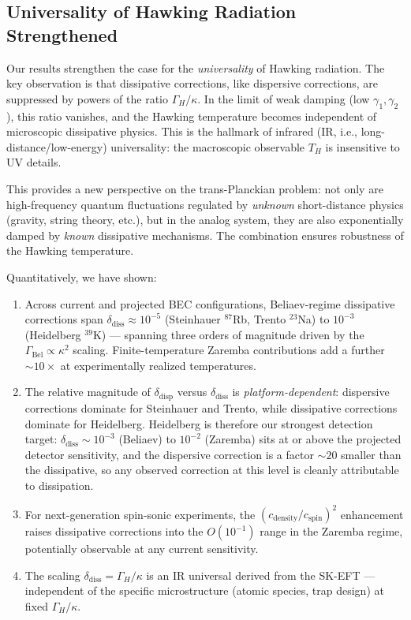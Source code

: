 \documentclass[aps,prl,twocolumn,superscriptaddress,nofootinbib,amsmath,amssymb]{revtex4-2}
\begin{document}
\subsection{Universality of Hawking Radiation Strengthened}

Our results strengthen the case for the \textit{universality} of Hawking radiation. The key observation is that dissipative corrections, like dispersive corrections, are suppressed by powers of the ratio $\Gamma_H / \kappa$. In the limit of weak damping (low $\gamma_1, \gamma_2$), this ratio vanishes, and the Hawking temperature becomes independent of microscopic dissipative physics. This is the hallmark of infrared (IR, i.e., long-distance/low-energy) universality: the macroscopic observable $T_H$ is insensitive to UV details.

This provides a new perspective on the trans-Planckian problem: not only are high-frequency quantum fluctuations regulated by \textit{unknown} short-distance physics (gravity, string theory, etc.), but in the analog system, they are also exponentially damped by \textit{known} dissipative mechanisms. The combination ensures robustness of the Hawking temperature.

Quantitatively, we have shown:
\begin{enumerate}
\item Across current and projected BEC configurations, Beliaev-regime dissipative
  corrections span $\delta_{\text{diss}} \approx 10^{-5}$ (Steinhauer $^{87}$Rb, Trento
  $^{23}$Na) to $10^{-3}$ (Heidelberg $^{39}$K) --- spanning three orders of magnitude
  driven by the $\Gamma_{\mathrm{Bel}} \propto \kappa^2$ scaling.
  Finite-temperature Zaremba contributions add a further $\sim\!10\times$ at
  experimentally realized temperatures.
\item The relative magnitude of $\delta_{\text{disp}}$ versus $\delta_{\text{diss}}$ is
  \emph{platform-dependent}: dispersive corrections dominate for Steinhauer and Trento,
  while dissipative corrections dominate for Heidelberg. Heidelberg is therefore our
  strongest detection target: $\delta_{\text{diss}} \sim 10^{-3}$ (Beliaev) to $10^{-2}$
  (Zaremba) sits at or above the projected detector sensitivity, and the dispersive
  correction is a factor ${\sim}20$ smaller than the dissipative, so any observed
  correction at this level is cleanly attributable to dissipation.
\item For next-generation spin-sonic experiments, the $(c_{\mathrm{density}}/c_{\mathrm{spin}})^2$
  enhancement raises dissipative corrections into the $O(10^{-1})$ range in the Zaremba
  regime, potentially observable at any current sensitivity.
\item The scaling $\delta_{\text{diss}} = \Gamma_H / \kappa$ is an IR universal derived
  from the SK-EFT --- independent of the specific microstructure (atomic species, trap
  design) at fixed $\Gamma_H / \kappa$.
\end{enumerate}
\end{document}
